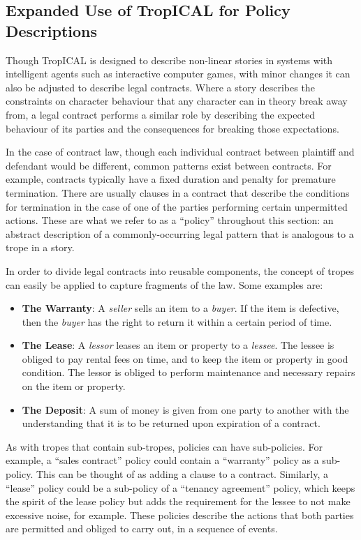 \documentclass[11pt]{report}
\begin{document}
\subsection{Expanded Use of TropICAL for Policy Descriptions}
\label{sec:t-legal}
Though TropICAL is designed to describe non-linear stories in systems with
intelligent agents such as
interactive computer games, with minor changes it can also be adjusted to
describe legal contracts. Where a story describes the constraints on character
behaviour that any character can in theory break away from, a legal contract
performs a similar role by describing the expected behaviour of its parties and
the consequences for breaking those expectations.

In the case of contract law, though each individual contract between plaintiff and
defendant would be different, common patterns exist between contracts. For
example, contracts typically have a fixed duration and penalty for premature
termination. There are usually clauses in a contract that describe the
conditions for termination in the case of one of the parties performing certain
unpermitted actions. These are what we refer to as a ``policy'' throughout this section: an abstract description of
a commonly-occurring legal pattern that is analogous to a trope in a story.

In order to divide legal contracts into reusable components, the concept of tropes can easily be applied to capture fragments of the law. Some
examples are:

\begin{itemize}
\item \textbf{The Warranty}: A \emph{seller} sells an item to a \emph{buyer}. If
  the item is defective, then the \emph{buyer} has the right to return it within
  a certain period of time.
\item \textbf{The Lease}: A \emph{lessor} leases an item or property to a
  \emph{lessee}. The lessee is obliged to pay rental fees on time, and to keep the item
  or property in good condition. The lessor is obliged to perform maintenance
  and necessary repairs on the item or property.
\item \textbf{The Deposit}: A sum of money is given from one party to another
  with the understanding that it is to be returned upon expiration of a contract. 
\end{itemize}

As with tropes that contain sub-tropes, policies can have sub-policies. For
example, a ``sales contract'' policy could contain a ``warranty'' policy as a
sub-policy. This can be thought of as adding a clause to a contract. Similarly,
a ``lease'' policy could be a sub-policy of a ``tenancy agreement'' policy,
which keeps the spirit of the lease policy but adds the requirement for the
lessee to not make excessive noise, for example. These policies describe the
actions that both parties are permitted and obliged to carry out, in a sequence of events.
\end{document}
